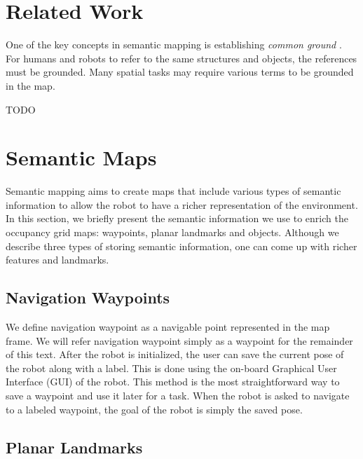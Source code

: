 \section{Related Work}
\label{sec:map_relevant_work}

One of the key concepts in semantic mapping is establishing \textit{common ground} \cite{clark1991grounding}. For humans and robots to refer to the same structures and objects, the references must be grounded. Many spatial tasks may require various terms to be grounded in the map.

TODO


\section{Semantic Maps}
\label{sec:map_semantic_maps}

Semantic mapping aims to create maps that include various types of semantic information to allow the robot to have a richer representation of the environment. In this section, we briefly present the semantic information we use to enrich the occupancy grid maps: waypoints, planar landmarks and objects. Although we describe three types of storing semantic information, one can come up with richer features and landmarks.

\subsection{Navigation Waypoints}
\label{sec:map_waypoints}

We define navigation waypoint as a navigable point represented in the map frame. We will refer navigation waypoint simply as a waypoint for the remainder of this text. After the robot is initialized, the user can save the current pose of the robot along with a label. This is done using the on-board Graphical User Interface (GUI) of the robot. This method is the most straightforward way to save a waypoint and use it later for a task. When the robot is asked to navigate to a labeled waypoint, the goal of the robot is simply the saved pose.



\subsection{Planar Landmarks}
\label{sec:map_landmarks}

